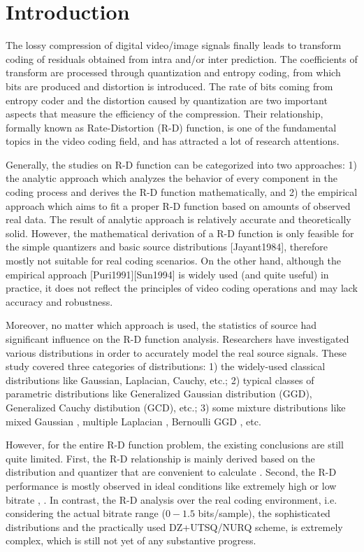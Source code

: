 \documentclass[smallabstract,smallcaptions]{dccpaper}
\begin{document}
\section{Introduction}

\let\thefootnote\relax{}

The lossy compression of digital video/image signals finally leads to transform coding of residuals obtained from intra and/or inter prediction. The coefficients of transform are processed through quantization and entropy coding, from which bits are produced and distortion is introduced. The rate of bits coming from entropy coder and the distortion caused by quantization are two important aspects that measure the efficiency of the compression. Their relationship, formally known as Rate-Distortion (R-D) function, is one of the fundamental topics in the video coding field, and has attracted a lot of research attentions.

Generally, the studies on R-D function can be categorized into two approaches: 1) the analytic approach which analyzes the behavior of every component in the coding process and derives the R-D function mathematically, and 2) the empirical approach which aims to fit a proper R-D function based on amounts of observed real data. The result of analytic approach is relatively accurate and theoretically solid. However, the mathematical derivation of a R-D function is only feasible for the simple quantizers and basic source distributions [Jayant1984], therefore mostly not suitable for real coding scenarios. On the other hand, although the empirical approach [Puri1991][Sun1994] is widely used (and quite useful) in practice, it does not reflect the principles of video coding operations and may lack accuracy and robustness.

Moreover, no matter which approach is used, the statistics of source had significant influence on the R-D function analysis. Researchers have investigated various distributions in order to accurately model the real source signals. These study covered three categories of distributions: 1) the widely-used classical distributions like Gaussian, Laplacian, Cauchy, etc.; 2) typical classes of parametric distributions \cite{Farvardin_TIT1984} like Generalized Gaussian distribution (GGD), Generalized Cauchy distibution (GCD), etc.; 3) some mixture distributions like mixed Gaussian \cite{Eude_ICASSP1994}, multiple Laplacian \cite{Lee_TCSVT2014}, Bernoulli GGD \cite{Fraysse_TIT2009}, etc.

However, for the entire R-D function problem, the existing conclusions are still quite limited. First, the R-D relationship is mainly derived based on the distribution and quantizer that are convenient to calculate \cite{Sun_TCSVT2009}. Second, the R-D performance is mostly observed in ideal conditions like extremely high or low bitrate \cite{Elias_TIT1970}, \cite{Marco_TIT2006}. In contrast, the R-D analysis over the real coding environment, i.e. considering the actual bitrate range ($0 - 1.5$ bits/sample), the sophisticated distributions and the practically used DZ+UTSQ/NURQ scheme, is extremely complex, which is still not yet of any substantive progress.
\end{document}
